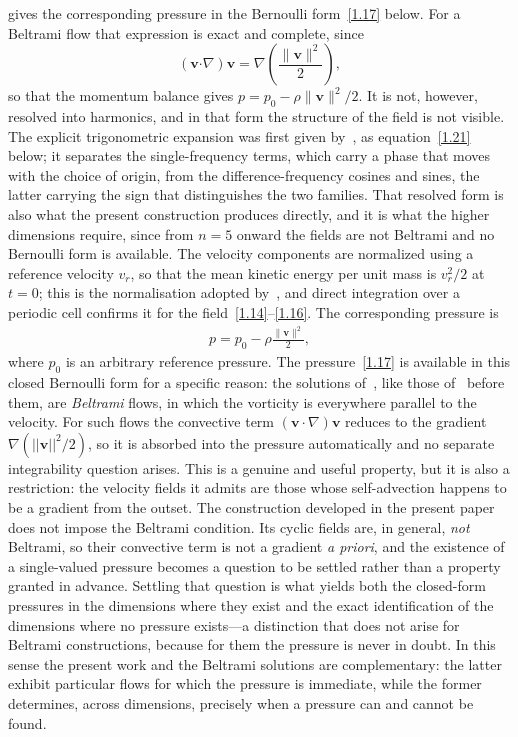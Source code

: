 \documentclass[11pt]{jfm}
\providecommand\bcdot{\boldsymbol{\cdot}}
\numberwithin{equation}{section}
\begin{document}
\citet{ant} gives the corresponding pressure in the Bernoulli form~\eqref{1.17} below. For a
Beltrami flow that expression is exact and complete, since
\[
(\boldsymbol{v}\bcdot\nabla)\boldsymbol{v}=\nabla\!\left(\frac{\lVert\boldsymbol{v}\rVert^2}{2}\right),
\]
so that the momentum balance gives $p=p_0-\rho\lVert\boldsymbol{v}\rVert^2/2$. It is not, however, resolved into harmonics,
and in that form the structure of the field is not visible. The explicit trigonometric
expansion was first given by~\citet{tha4}, as equation~\eqref{1.21} below; it separates the
single-frequency terms, which carry a phase that moves with the choice of origin, from the
difference-frequency cosines and sines, the latter carrying the sign that distinguishes the two
families. That resolved form is also what the present construction produces directly, and it is
what the higher dimensions require, since from $n=5$ onward the fields are not Beltrami and no
Bernoulli form is available.
The velocity components are normalized using a reference velocity $v_r$, so that the mean kinetic
energy per unit mass is $v_r^2/2$ at $t=0$; this is the normalisation adopted by~\citet{ant}, and
direct integration over a periodic cell confirms it for the field~\eqref{1.14}--\eqref{1.16}. The
corresponding pressure is
\begin{eqnarray}
\label{1.17}
p=p_0-\rho\frac{\lVert\boldsymbol{v}\rVert^2}{2},
\end{eqnarray}
where $p_0$ is an arbitrary reference pressure. The pressure~\eqref{1.17} is available in this closed Bernoulli form for a specific reason: the
solutions of~\citet{ant}, like those of~\citet{eth} before them, are \emph{Beltrami} flows, in
which the vorticity is everywhere parallel to the velocity. For such flows the convective term
$(\boldsymbol{v}\!\cdot\!\nabla)\boldsymbol{v}$ reduces to the gradient $\nabla(\lvert\lvert\boldsymbol{v}\rvert\rvert^2/2)$,
so it is absorbed into the pressure automatically and no separate integrability question arises.
This is a genuine and useful property, but it is also a restriction: the velocity fields it admits
are those whose self-advection happens to be a gradient from the outset. The construction developed
in the present paper does not impose the Beltrami condition. Its cyclic fields are, in general,
\emph{not} Beltrami, so their convective term is not a gradient \emph{a priori}, and the existence
of a single-valued pressure becomes a question to be settled rather than a property granted in
advance. Settling that question is what yields both the closed-form pressures in the dimensions
where they exist and the exact identification of the dimensions where no pressure exists---a
distinction that does not arise for Beltrami constructions, because for them the pressure is never
in doubt. In this sense the present work and the Beltrami solutions are complementary: the latter
exhibit particular flows for which the pressure is immediate, while the former determines, across
dimensions, precisely when a pressure can and cannot be found.
\end{document}

